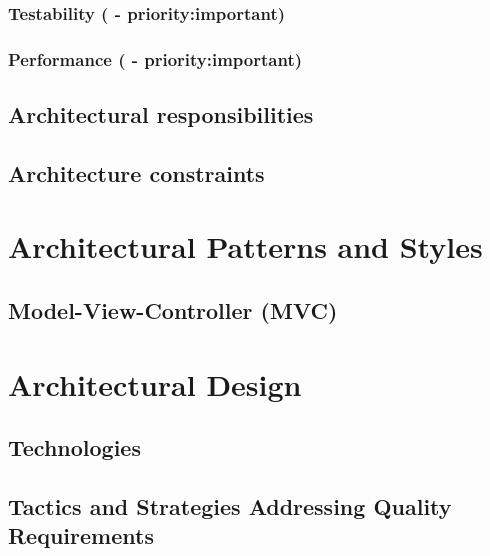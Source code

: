 \documentclass[a4paper,12pt,titlepage]{article}
\begin{document}
		\subsubsection{Testability ( - priority:important)} \label{sec:testability}
			
		
		\subsubsection{Performance ( - priority:important)} \label{sec:performance}
			
			
	\newpage
	\subsection{Architectural responsibilities}
		
		
	\newpage	
	\subsection{Architecture constraints}
		



\newpage
\section{Architectural Patterns and Styles}
	\subsection{Model-View-Controller (MVC)}
	

\newpage	
\section{Architectural Design}	
	\subsection{Technologies}
		
	\newpage	
	\subsection{Tactics and Strategies Addressing Quality Requirements}
		
		
\end{document}
